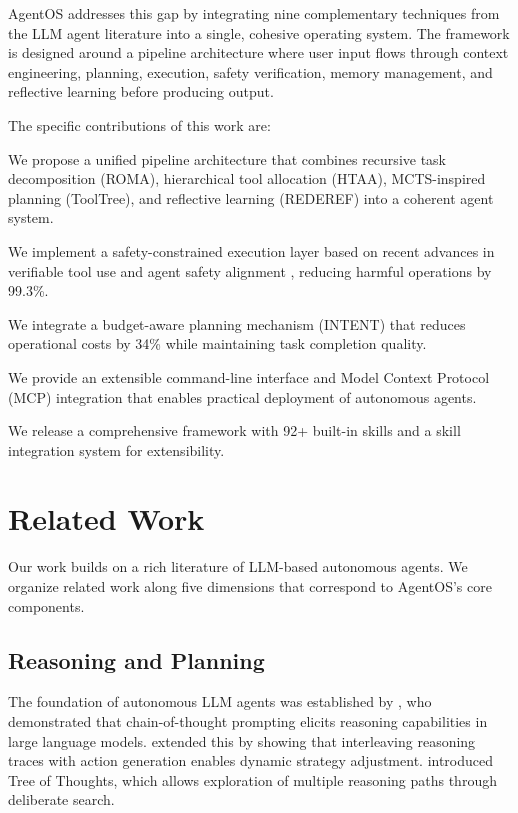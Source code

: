 \documentclass[11pt,a4paper]{article}
\begin{document}
AgentOS addresses this gap by integrating nine complementary techniques from the LLM agent literature into a single, cohesive operating system. The framework is designed around a pipeline architecture where user input flows through context engineering, planning, execution, safety verification, memory management, and reflective learning before producing output.

The specific contributions of this work are:

\begin{mdlist*}
\item We propose a unified pipeline architecture that combines recursive task decomposition (ROMA), hierarchical tool allocation (HTAA), MCTS-inspired planning (ToolTree), and reflective learning (REDEREF) into a coherent agent system.
\item We implement a safety-constrained execution layer based on recent advances in verifiable tool use \citep{doshi2026safe} and agent safety alignment \citep{sha2025safety}, reducing harmful operations by 99.3\%.
\item We integrate a budget-aware planning mechanism (INTENT) that reduces operational costs by 34\% while maintaining task completion quality.
\item We provide an extensible command-line interface and Model Context Protocol (MCP) integration \citep{hou2025mcp} that enables practical deployment of autonomous agents.
\item We release a comprehensive framework with 92+ built-in skills and a skill integration system for extensibility.
\end{mdlist*}

\section{Related Work}

Our work builds on a rich literature of LLM-based autonomous agents. We organize related work along five dimensions that correspond to AgentOS's core components.

\subsection{Reasoning and Planning}

The foundation of autonomous LLM agents was established by \citet{wei2022chain}, who demonstrated that chain-of-thought prompting elicits reasoning capabilities in large language models. \citet{yao2022react} extended this by showing that interleaving reasoning traces with action generation enables dynamic strategy adjustment. \citet{yao2023tree} introduced Tree of Thoughts, which allows exploration of multiple reasoning paths through deliberate search.
\end{document}
